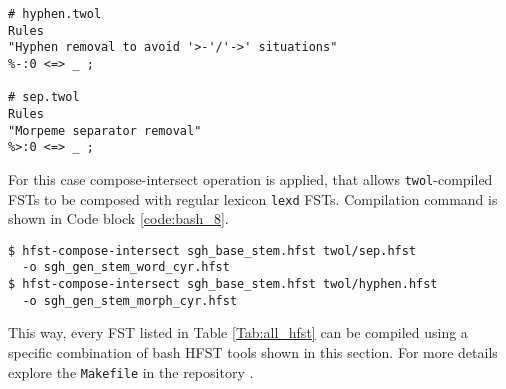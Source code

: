 \begin{code_frame}[float,floatplacement=!h]
    \begin{footnotesize}\codespacing
    \begin{verbatim}
# hyphen.twol
Rules
"Hyphen removal to avoid '>-'/'->' situations"
%-:0 <=> _ ;

# sep.twol
Rules
"Morpeme separator removal"
%>:0 <=> _ ;
    \end{verbatim}
    \end{footnotesize}
    \tcblower
    \label{code:twol_4_1}
\end{code_frame}

For this case compose-intersect operation is applied, that allows \texttt{twol}-compiled FSTs to be composed with regular lexicon \texttt{lexd} FSTs. Compilation command is shown in Code block \ref{code:bash_8}.

\begin{code_frame}[float,floatplacement=!h]
    \begin{footnotesize}\codespacing
    \begin{verbatim}
$ hfst-compose-intersect sgh_base_stem.hfst twol/sep.hfst 
  -o sgh_gen_stem_word_cyr.hfst
$ hfst-compose-intersect sgh_base_stem.hfst twol/hyphen.hfst 
  -o sgh_gen_stem_morph_cyr.hfst
    \end{verbatim}
    \end{footnotesize}
    \tcblower
    \label{code:bash_8}
\end{code_frame}

This way, every FST listed in Table \ref{Tab:all_hfst} can be compiled using a specific combination of bash HFST tools shown in this section. For more details explore the \texttt{Makefile} in the repository \parencite{kartina_2025_repo}. 

